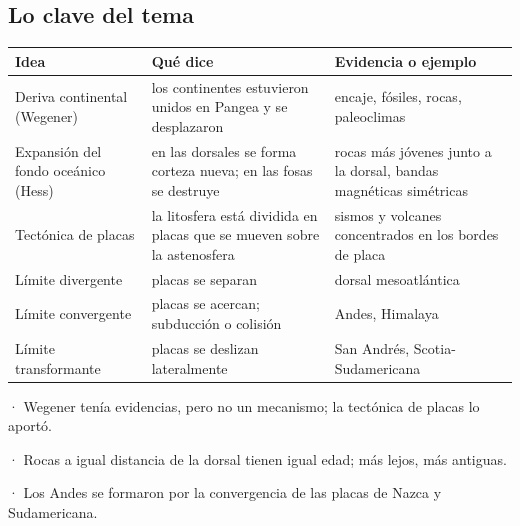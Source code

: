 \subsection{Lo clave del tema}
\begin{center}\small
\begin{tabularx}{\linewidth}{@{}>{\raggedright\arraybackslash\hsize=0.91\hsize}X>{\raggedright\arraybackslash\hsize=1.04\hsize}X>{\raggedright\arraybackslash\hsize=1.04\hsize}X@{}}
\toprule
\textbf{Idea} & \textbf{Qué dice} & \textbf{Evidencia o ejemplo} \\
\midrule
Deriva continental (Wegener) & los continentes estuvieron unidos en Pangea y se desplazaron & encaje, fósiles, rocas, paleoclimas \\
Expansión del fondo oceánico (Hess) & en las dorsales se forma corteza nueva; en las fosas se destruye & rocas más jóvenes junto a la dorsal, bandas magnéticas simétricas \\
Tectónica de placas & la litosfera está dividida en placas que se mueven sobre la astenosfera & sismos y volcanes concentrados en los bordes de placa \\
Límite divergente & placas se separan & dorsal mesoatlántica \\
Límite convergente & placas se acercan; subducción o colisión & Andes, Himalaya \\
Límite transformante & placas se deslizan lateralmente & San Andrés, Scotia-Sudamericana \\
\bottomrule
\end{tabularx}
\end{center}
 
\begin{clave}[{Recuerda}] · Wegener tenía evidencias, pero no un mecanismo; la tectónica de placas lo aportó.\par · Rocas a igual distancia de la dorsal tienen igual edad; más lejos, más antiguas.\par · Los Andes se formaron por la convergencia de las placas de Nazca y Sudamericana.\end{clave}
 
